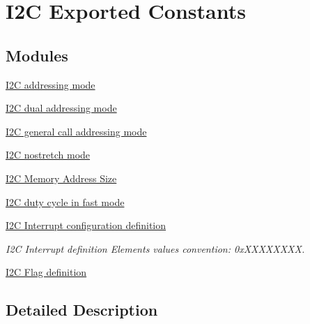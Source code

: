 \hypertarget{group___i2_c___exported___constants}{\section{I2\-C Exported Constants}
\label{group___i2_c___exported___constants}
}
\subsection*{Modules}
\begin{DoxyCompactItemize}
\item 
\hyperlink{group___i2_c__addressing__mode}{I2\-C addressing mode}
\item 
\hyperlink{group___i2_c__dual__addressing__mode}{I2\-C dual addressing mode}
\item 
\hyperlink{group___i2_c__general__call__addressing__mode}{I2\-C general call addressing mode}
\item 
\hyperlink{group___i2_c__nostretch__mode}{I2\-C nostretch mode}
\item 
\hyperlink{group___i2_c___memory___address___size}{I2\-C Memory Address Size}
\item 
\hyperlink{group___i2_c__duty__cycle__in__fast__mode}{I2\-C duty cycle in fast mode}
\item 
\hyperlink{group___i2_c___interrupt__configuration__definition}{I2\-C Interrupt configuration definition}
\begin{DoxyCompactList}\small\item\em I2\-C Interrupt definition Elements values convention\-: 0x\-X\-X\-X\-X\-X\-X\-X\-X. \end{DoxyCompactList}\item 
\hyperlink{group___i2_c___flag__definition}{I2\-C Flag definition}
\end{DoxyCompactItemize}


\subsection{Detailed Description}
